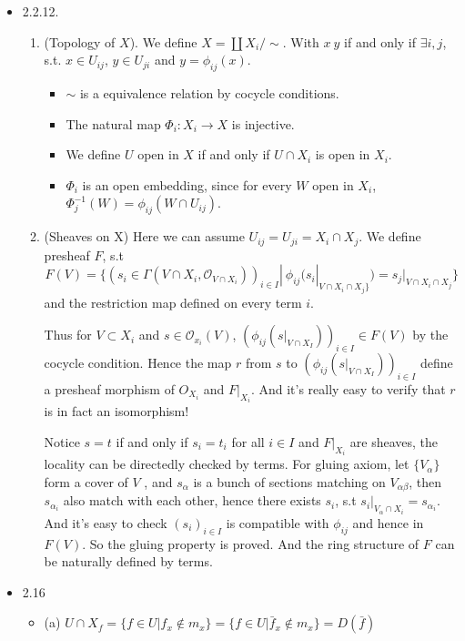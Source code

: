 \documentclass[12pt]{article}
\begin{document}
\begin{itemize}
\item 2.2.12.\
  \begin{enumerate}
  \item (Topology of $X$). We define $X=\coprod X_i/\sim$. With $x~y$ if and only if $\exists{} i,j$, s.t. $x\in U_{ij}$, $y\in U_{ji}$ and $y=\phi_{ij}(x)$.
    \begin{itemize}
    \item $\sim$ is a equivalence relation by cocycle conditions.
    \item The natural map $\Phi_i: X_i\to X$ is injective.
    \item We define $U$ open in $X$ if and only if $U\cap X_i$ is open in $X_i$.
    \item $\Phi_i$ is an open embedding, since for every $W$ open in $X_i$, $\Phi_j^{-1}(W)=\phi_{ij}(W \cap U_{ij})$.
    \end{itemize}
  \item (Sheaves on X) Here we can assume $U_{ij}=U_{ji}=X_i\cap X_j$. We define presheaf $F$, s.t 
$$F(V)=\{(s_i \in \Gamma(V \cap X_i,\mathcal{O}_{V \cap X_i}))_{i\in I}|\  \phi_{ij}(s_i|_{V\cap X_i \cap X_j\}})=s_j|_{V\cap X_i \cap X_j}\}$$ and the restriction map defined on every term $i$.

Thus for $V \subset X_i$ and $s \in \mathcal{O}_{x_i}(V)$, $(\phi_{ij}(s|_{V \cap X_I}))_{i \in I} \in F(V)$ by the cocycle condition. Hence the map $r$ from $s$ to $(\phi_{ij}(s|_{V \cap X_I}))_{i \in I}$ define a presheaf morphism of $O_{X_i}$ and $F|_{X_i}$. And it's really easy to verify that $r$ is in fact an isomorphism!

Notice $s=t$ if and only if $s_i=t_i$ for all $i\in I$ and $F|_{X_i}$ are sheaves, the locality can be directedly checked by terms. For gluing axiom, let $\{V_\alpha\}$ form a cover of $V$ , and $s_\alpha$ is a bunch of sections matching on $V_{\alpha\beta}$, then $s_{\alpha_i}$ also match with each other, hence there exists $s_i$, s.t $s_i|_{V_\alpha \cap X_i}=s_{\alpha_i}$. And it's easy to check $(s_i)_{i\in I}$ is compatible with $\phi_{ij}$ and hence in $F(V)$. So the gluing property is proved. And the ring structure of $F$ can be naturally defined by terms.
  \end{enumerate} 
   
\item 2.16
  \begin{itemize}
  \item (a) $U\cap X_f=\{f\in U|f_x \notin m_x\} =\{f\in U| \bar{f}_x\notin m_x\}=D(\bar{f})$


\end{itemize}
\end{itemize}
\end{document}
